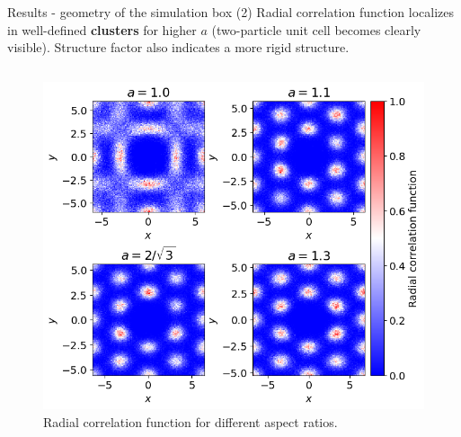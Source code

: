 \documentclass{beamer}
\begin{document}
\begin{frame}{Results - geometry of the simulation box (2)}
  Radial correlation function localizes in well-defined \textbf{clusters} for higher $a$ (two-particle unit 
  cell becomes clearly visible). Structure factor also indicates a more rigid structure.
  \begin{columns}
    \begin{column}{0.5\textwidth}
      \begin{figure}
        \centering
        \vspace{-0.75cm}
        \includegraphics[scale=0.35]{figures/pair_corr_func_xy_diff_a_2.png}
        \caption{Radial correlation function for different aspect ratios.}
      \end{figure}
    \end{column}


\end{columns}
\end{frame}
\end{document}
